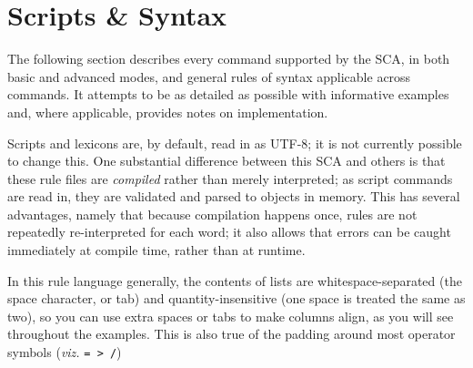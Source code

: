 \documentclass[10pt,letterpaper]{article}
\newcounter{vexcounter}
\newenvironment{vex}[1]{
	\refstepcounter{vexcounter}
	\noindent\emph{Ex.} (\arabic{vexcounter}\label{#1})
	\verbatim
}{\endverbatim}
\begin{document}
%



\section{Scripts \& Syntax}\label{sec:syntax}
The following section describes every command supported by the SCA, in both basic and advanced modes, and general rules of syntax applicable across commands. It attempts to be as detailed as possible with informative examples and, where applicable, provides notes on implementation.

Scripts and lexicons are, by default, read in as UTF-8; it is not currently possible to change this. One substantial difference between this SCA and others is that these rule files are \emph{compiled} rather than merely interpreted; as script commands are read in, they are validated and parsed to objects in memory. This has several advantages, namely that because compilation happens once, rules are not repeatedly re-interpreted for each word; it also allows that errors can be caught immediately at compile time, rather than at runtime.

In this rule language generally, the contents of lists are whitespace-separated (the space character, or tab) and quantity-insensitive (one space is treated the same as two), so you can use extra spaces or tabs to make columns align, as you will see throughout the examples. This is also true of the padding around most operator symbols (\emph{viz.} \texttt{= > /})
\end{document}
